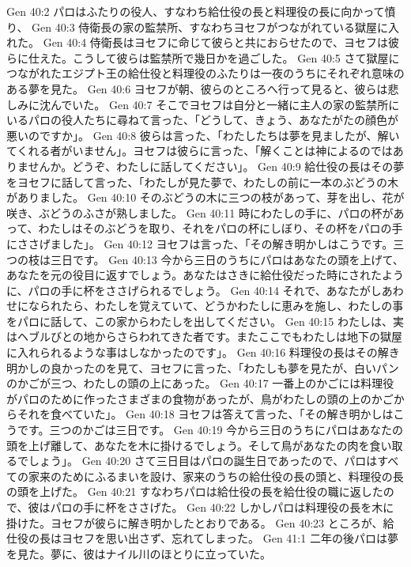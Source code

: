 Gen 40:2  パロはふたりの役人、すなわち給仕役の長と料理役の長に向かって憤り、
Gen 40:3  侍衛長の家の監禁所、すなわちヨセフがつながれている獄屋に入れた。
Gen 40:4  侍衛長はヨセフに命じて彼らと共におらせたので、ヨセフは彼らに仕えた。こうして彼らは監禁所で幾日かを過ごした。
Gen 40:5  さて獄屋につながれたエジプト王の給仕役と料理役のふたりは一夜のうちにそれぞれ意味のある夢を見た。
Gen 40:6  ヨセフが朝、彼らのところへ行って見ると、彼らは悲しみに沈んでいた。
Gen 40:7  そこでヨセフは自分と一緒に主人の家の監禁所にいるパロの役人たちに尋ねて言った、「どうして、きょう、あなたがたの顔色が悪いのですか」。
Gen 40:8  彼らは言った、「わたしたちは夢を見ましたが、解いてくれる者がいません」。ヨセフは彼らに言った、「解くことは神によるのではありませんか。どうぞ、わたしに話してください」。
Gen 40:9  給仕役の長はその夢をヨセフに話して言った、「わたしが見た夢で、わたしの前に一本のぶどうの木がありました。
Gen 40:10  そのぶどうの木に三つの枝があって、芽を出し、花が咲き、ぶどうのふさが熟しました。
Gen 40:11  時にわたしの手に、パロの杯があって、わたしはそのぶどうを取り、それをパロの杯にしぼり、その杯をパロの手にささげました」。
Gen 40:12  ヨセフは言った、「その解き明かしはこうです。三つの枝は三日です。
Gen 40:13  今から三日のうちにパロはあなたの頭を上げて、あなたを元の役目に返すでしょう。あなたはさきに給仕役だった時にされたように、パロの手に杯をささげられるでしょう。
Gen 40:14  それで、あなたがしあわせになられたら、わたしを覚えていて、どうかわたしに恵みを施し、わたしの事をパロに話して、この家からわたしを出してください。
Gen 40:15  わたしは、実はヘブルびとの地からさらわれてきた者です。またここでもわたしは地下の獄屋に入れられるような事はしなかったのです」。
Gen 40:16  料理役の長はその解き明かしの良かったのを見て、ヨセフに言った、「わたしも夢を見たが、白いパンのかごが三つ、わたしの頭の上にあった。
Gen 40:17  一番上のかごには料理役がパロのために作ったさまざまの食物があったが、鳥がわたしの頭の上のかごからそれを食べていた」。
Gen 40:18  ヨセフは答えて言った、「その解き明かしはこうです。三つのかごは三日です。
Gen 40:19  今から三日のうちにパロはあなたの頭を上げ離して、あなたを木に掛けるでしょう。そして鳥があなたの肉を食い取るでしょう」。
Gen 40:20  さて三日目はパロの誕生日であったので、パロはすべての家来のためにふるまいを設け、家来のうちの給仕役の長の頭と、料理役の長の頭を上げた。
Gen 40:21  すなわちパロは給仕役の長を給仕役の職に返したので、彼はパロの手に杯をささげた。
Gen 40:22  しかしパロは料理役の長を木に掛けた。ヨセフが彼らに解き明かしたとおりである。
Gen 40:23  ところが、給仕役の長はヨセフを思い出さず、忘れてしまった。
Gen 41:1  二年の後パロは夢を見た。夢に、彼はナイル川のほとりに立っていた。

